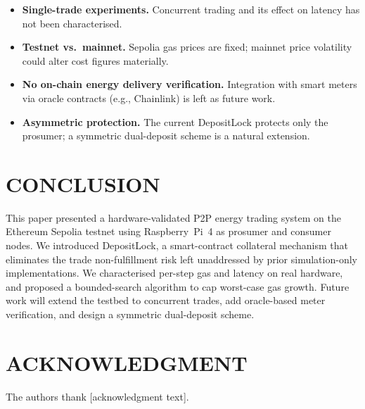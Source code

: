 \documentclass{IEEEoj}
\begin{document}
\begin{itemize}
  \item \textbf{Single-trade experiments.} Concurrent trading and its
        effect on latency has not been characterised.
  \item \textbf{Testnet vs.\ mainnet.} Sepolia gas prices are fixed;
        mainnet price volatility could alter cost figures materially.
  \item \textbf{No on-chain energy delivery verification.} Integration with
        smart meters via oracle contracts (e.g., Chainlink) is left as future
        work.
  \item \textbf{Asymmetric protection.} The current DepositLock protects
        only the prosumer; a symmetric dual-deposit scheme is a natural
        extension.
\end{itemize}


\section{CONCLUSION}
\label{sec:conclusion}

This paper presented a hardware-validated P2P energy trading system on the
Ethereum Sepolia testnet using Raspberry~Pi~4 as prosumer and consumer nodes.
We introduced DepositLock, a smart-contract collateral mechanism that
eliminates the trade non-fulfillment risk left unaddressed by prior
simulation-only implementations.
We characterised per-step gas and latency on real hardware, and proposed a
bounded-search algorithm to cap worst-case gas growth.
Future work will extend the testbed to concurrent trades, add oracle-based
meter verification, and design a symmetric dual-deposit scheme.


\section*{ACKNOWLEDGMENT}
The authors thank [acknowledgment text].
\end{document}
